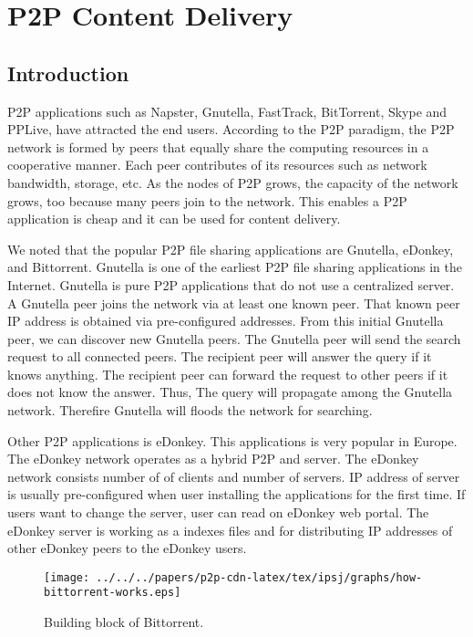 \chapter{P2P Content Delivery}
\section{Introduction}

P2P applications such as Napster, Gnutella, FastTrack, BitTorrent, Skype and PPLive, have attracted the end users.
According to the P2P paradigm, the P2P network is formed by peers that equally share the computing resources in a cooperative manner.
Each peer contributes of its resources such as network bandwidth, storage, etc. 
As the nodes of P2P grows, the capacity of the network grows, too because many peers join to the network. 
This enables a P2P application is cheap and it can be used for content delivery.  

We noted that the popular P2P file sharing applications are Gnutella, eDonkey, and Bittorrent.  
Gnutella is one of the earliest P2P file sharing applications in the Internet.
Gnutella is pure P2P applications that do not use a centralized server.
A Gnutella peer joins the network via at least one known peer.
That known peer IP address is obtained via pre-configured addresses. 
From this initial Gnutella peer, we can discover new Gnutella peers.
The Gnutella peer will send the search request to all connected peers. 
The recipient peer will answer the query if it knows anything. 
The recipient peer can forward the request to other peers if it does not know the answer.
Thus, The query will propagate among the Gnutella network.
Therefire Gnutella will floods the network for searching.

Other P2P applications is eDonkey.  
This applications is very popular in Europe. 
The eDonkey network operates as a hybrid P2P and server. 
The eDonkey network consists number of of clients and number of servers. 
IP address of server is usually pre-configured when user installing the applications for the first time.  
If users want to change the server, user can read on eDonkey web portal.
The eDonkey server is working as a indexes files and for distributing IP addresses of other eDonkey peers to the eDonkey users.

\begin{figure}[tb]
\begin{center}
\texttt{[image: ../../../papers/p2p-cdn-latex/tex/ipsj/graphs/how-bittorrent-works.eps]}
\end{center}
\caption{Building block of Bittorrent.} 
\label{fig:bittorrentblock}
\end{figure}



